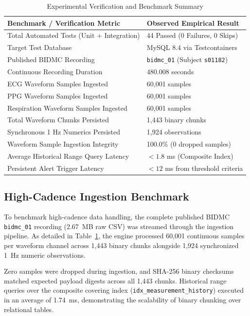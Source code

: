 \documentclass[10pt,journal,compsoc]{IEEEtran}
\begin{document}
\begin{table}[!t]
\renewcommand{\arraystretch}{1.2}
\caption{Experimental Verification and Benchmark Summary}
\label{tab:benchmarks}
\centering
\begin{tabular}{@{}ll@{}}
\toprule
\textbf{Benchmark / Verification Metric} & \textbf{Observed Empirical Result} \\
\midrule
Total Automated Tests (Unit + Integration) & 44 Passed (0 Failures, 0 Skips) \\
Target Test Database & MySQL 8.4 via Testcontainers \\
Published BIDMC Recording & \texttt{bidmc\_01} (Subject \texttt{s01182}) \\
Continuous Recording Duration & 480.008 seconds \\
ECG Waveform Samples Ingested & 60,001 samples \\
PPG Waveform Samples Ingested & 60,001 samples \\
Respiration Waveform Samples Ingested & 60,001 samples \\
Total Waveform Chunks Persisted & 1,443 binary chunks \\
Synchronous 1 Hz Numerics Persisted & 1,924 observations \\
Waveform Sample Ingestion Integrity & 100.0\% (0 dropped samples) \\
Average Historical Range Query Latency & $< 1.8$ ms (Composite Index) \\
Persistent Alert Trigger Latency & $< 12$ ms from threshold criteria \\
\bottomrule
\end{tabular}
\end{table}

\subsection{High-Cadence Ingestion Benchmark}
To benchmark high-cadence data handling, the complete published BIDMC \texttt{bidmc\_01} recording (2.67~MB raw CSV) was streamed through the ingestion pipeline. As detailed in Table~\ref{tab:benchmarks}, the engine processed 60,001 continuous samples per waveform channel across 1,443 binary chunks alongside 1,924 synchronized 1~Hz numeric observations. 

Zero samples were dropped during ingestion, and SHA-256 binary checksums matched expected payload digests across all 1,443 chunks. Historical range queries over the composite covering index (\texttt{idx\_measurement\_history}) executed in an average of 1.74~ms, demonstrating the scalability of binary chunking over relational tables.
\end{document}

